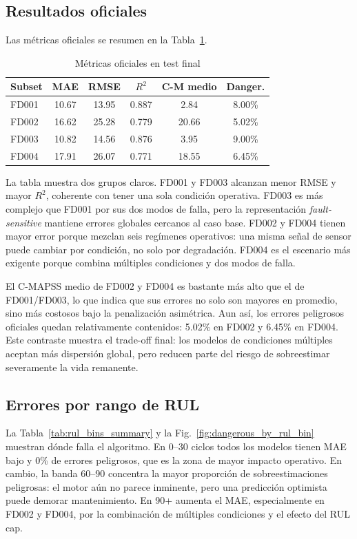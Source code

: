\documentclass[conference, a4paper]{IEEEtran}
\begin{document}
\subsection{Resultados oficiales}
Las métricas oficiales se resumen en la Tabla~\ref{tab:official_metrics}.

\begin{table}[!htbp]
\caption{Métricas oficiales en test final}
\label{tab:official_metrics}
\centering
\scriptsize
\begin{tabular}{lccccc}
\hline
Subset & MAE & RMSE & $R^2$ & C-M medio & Danger. \\
\hline
FD001 & 10.67 & 13.95 & 0.887 & 2.84 & 8.00\% \\
FD002 & 16.62 & 25.28 & 0.779 & 20.66 & 5.02\% \\
FD003 & 10.82 & 14.56 & 0.876 & 3.95 & 9.00\% \\
FD004 & 17.91 & 26.07 & 0.771 & 18.55 & 6.45\% \\
\hline
\end{tabular}
\end{table}

La tabla muestra dos grupos claros. FD001 y FD003 alcanzan menor RMSE y mayor $R^2$, coherente con tener una sola condición operativa. FD003 es más complejo que FD001 por sus dos modos de falla, pero la representación \textit{fault-sensitive} mantiene errores globales cercanos al caso base. FD002 y FD004 tienen mayor error porque mezclan seis regímenes operativos: una misma señal de sensor puede cambiar por condición, no solo por degradación. FD004 es el escenario más exigente porque combina múltiples condiciones y dos modos de falla.

El C-MAPSS medio de FD002 y FD004 es bastante más alto que el de FD001/FD003, lo que indica que sus errores no solo son mayores en promedio, sino más costosos bajo la penalización asimétrica. Aun así, los errores peligrosos oficiales quedan relativamente contenidos: 5.02\% en FD002 y 6.45\% en FD004. Este contraste muestra el trade-off final: los modelos de condiciones múltiples aceptan más dispersión global, pero reducen parte del riesgo de sobreestimar severamente la vida remanente.

\subsection{Errores por rango de RUL}
La Tabla~\ref{tab:rul_bins_summary} y la Fig.~\ref{fig:dangerous_by_rul_bin} muestran dónde falla el algoritmo. En 0--30 ciclos todos los modelos tienen MAE bajo y 0\% de errores peligrosos, que es la zona de mayor impacto operativo. En cambio, la banda 60--90 concentra la mayor proporción de sobreestimaciones peligrosas: el motor aún no parece inminente, pero una predicción optimista puede demorar mantenimiento. En 90+ aumenta el MAE, especialmente en FD002 y FD004, por la combinación de múltiples condiciones y el efecto del RUL cap.
\end{document}
